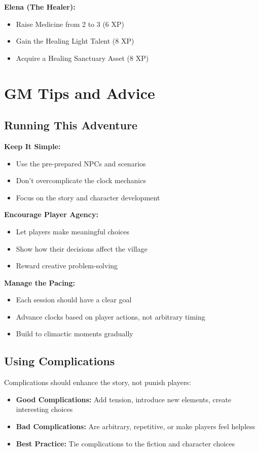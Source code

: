 \documentclass[11pt]{article}
\begin{document}
\textbf{Elena (The Healer):}
\begin{itemize}
\item Raise Medicine from 2 to 3 (6 XP)
\item Gain the Healing Light Talent (8 XP)
\item Acquire a Healing Sanctuary Asset (8 XP)
\end{itemize}

\section{GM Tips and Advice}

\subsection{Running This Adventure}

\textbf{Keep It Simple:}
\begin{itemize}
\item Use the pre-prepared NPCs and scenarios
\item Don't overcomplicate the clock mechanics
\item Focus on the story and character development
\end{itemize}

\textbf{Encourage Player Agency:}
\begin{itemize}
\item Let players make meaningful choices
\item Show how their decisions affect the village
\item Reward creative problem-solving
\end{itemize}

\textbf{Manage the Pacing:}
\begin{itemize}
\item Each session should have a clear goal
\item Advance clocks based on player actions, not arbitrary timing
\item Build to climactic moments gradually
\end{itemize}

\subsection{Using Complications}

Complications should enhance the story, not punish players:
\begin{itemize}
\item \textbf{Good Complications:} Add tension, introduce new elements, create interesting choices
\item \textbf{Bad Complications:} Are arbitrary, repetitive, or make players feel helpless
\item \textbf{Best Practice:} Tie complications to the fiction and character choices
\end{itemize}
\end{document}
